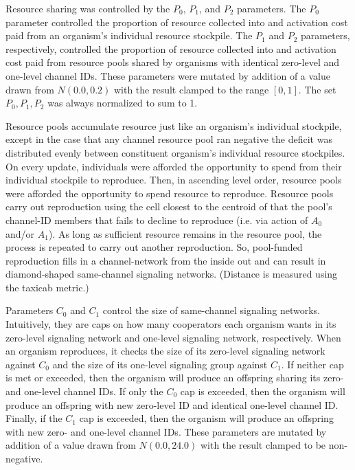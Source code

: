Resource sharing was controlled by the $P_0$, $P_1$, and $P_2$ parameters.
The $P_0$ parameter controlled the proportion of resource collected into and activation cost paid from an organism's individual resource stockpile.
The $P_1$ and $P_2$ parameters, respectively, controlled the proportion of resource collected into and activation cost paid from resource pools shared by organisms with identical zero-level and one-level channel IDs.
These parameters were mutated by addition of a value drawn from $N(0.0,0.2)$ with the result clamped to the range $[0,1]$.
The set $P_0, P_1, P_2$ was always normalized to sum to 1.

Resource pools accumulate resource just like an organism's individual stockpile, except in the case that any channel resource pool ran negative the deficit was distributed evenly between constituent organism's individual resource stockpiles.
On every update, individuals were afforded the opportunity to spend from their individual stockpile to reproduce.
Then, in ascending level order, resource pools were afforded the opportunity to spend resource to reproduce.
Resource pools carry out reproduction using the cell closest to the centroid of that the pool's channel-ID members that fails to decline to reproduce (i.e. via action of $A_0$ and/or $A_1$).
As long as sufficient resource remains in the resource pool, the process is repeated to carry out another reproduction.
So, pool-funded reproduction fills in a channel-network from the inside out and can result in diamond-shaped same-channel signaling networks.
(Distance is measured using the taxicab metric.)

Parameters $C_0$ and $C_1$ control the size of same-channel signaling networks.
Intuitively, they are caps on how many cooperators each organism wants in its zero-level signaling network and one-level signaling network, respectively.
When an organism reproduces, it checks the size of its zero-level signaling network against $C_0$ and the size of its one-level signaling group against $C_1$.
If neither cap is met or exceeded, then the organism will produce an offspring sharing its zero- and one-level channel IDs.
If only the $C_0$ cap is exceeded, then the organism will produce an offspring with new zero-level ID and identical one-level channel ID.
Finally, if the $C_1$ cap is exceeded, then the organism will produce an offspring with new zero- and one-level channel IDs.
These parameters are mutated by addition of a value drawn from $N(0.0,24.0)$ with the result clamped to be non-negative.

